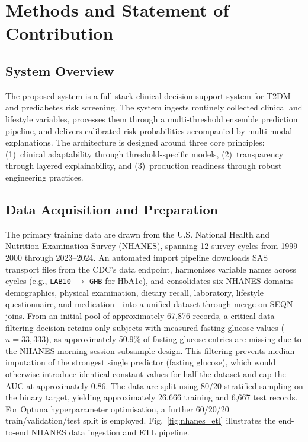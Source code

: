 \documentclass[conference]{IEEEtran}
\begin{document}
\section{Methods and Statement of Contribution}

\subsection{System Overview}

The proposed system is a full-stack clinical decision-support system for T2DM and prediabetes risk screening. The system ingests routinely collected clinical and lifestyle variables, processes them through a multi-threshold ensemble prediction pipeline, and delivers calibrated risk probabilities accompanied by multi-modal explanations. The architecture is designed around three core principles: (1)~clinical adaptability through threshold-specific models, (2)~transparency through layered explainability, and (3)~production readiness through robust engineering practices.

\subsection{Data Acquisition and Preparation}

The primary training data are drawn from the U.S. National Health and Nutrition Examination Survey (NHANES), spanning 12 survey cycles from 1999--2000 through 2023--2024. An automated import pipeline downloads SAS transport files from the CDC's data endpoint, harmonises variable names across cycles (e.g., \texttt{LAB10} $\rightarrow$ \texttt{GHB} for HbA1c), and consolidates six NHANES domains---demographics, physical examination, dietary recall, laboratory, lifestyle questionnaire, and medication---into a unified dataset through merge-on-SEQN joins. From an initial pool of approximately 67,876 records, a critical data filtering decision retains only subjects with measured fasting glucose values ($n = 33{,}333$), as approximately 50.9\% of fasting glucose entries are missing due to the NHANES morning-session subsample design. This filtering prevents median imputation of the strongest single predictor (fasting glucose), which would otherwise introduce identical constant values for half the dataset and cap the AUC at approximately 0.86. The data are split using 80/20 stratified sampling on the binary target, yielding approximately 26,666 training and 6,667 test records. For Optuna hyperparameter optimisation, a further 60/20/20 train/validation/test split is employed. Fig.~\ref{fig:nhanes_etl} illustrates the end-to-end NHANES data ingestion and ETL pipeline.
\end{document}
